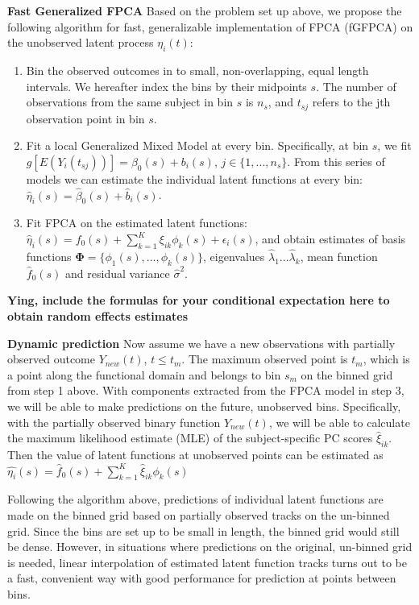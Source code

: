 \documentclass[
  11pt,
]{article}
\begin{document}
\textbf{Fast Generalized FPCA} Based on the problem set up above, we
propose the following algorithm for fast, generalizable implementation
of FPCA (fGFPCA) on the unobserved latent process \(\eta_i(t)\):

\begin{enumerate}
\def\labelenumi{\arabic{enumi}.}
\item
  Bin the observed outcomes in to small, non-overlapping, equal length
  intervals. We hereafter index the bins by their midpoints \(s\). The
  number of observations from the same subject in bin \(s\) is \(n_s\),
  and \(t_{sj}\) refers to the jth observation point in bin \(s\).
\item
  Fit a local Generalized Mixed Model at every bin. Specifically, at bin
  \(s\), we fit \(g[E(Y_i(t_{sj}))] = \beta_0(s)+b_i(s)\),
  \(j\in\{1, ..., n_s\}\). From this series of models we can estimate
  the individual latent functions at every bin:
  \(\hat{\eta}_i(s) = \hat{\beta}_0(s)+\hat{b}_i(s)\).
\item
  Fit FPCA on the estimated latent functions:
  \(\hat{\eta}_i(s) = f_0(s)+\sum_{k=1}^K\xi_{ik}\phi_{k}(s)+\epsilon_i(s)\),
  and obtain estimates of basis functions
  \(\boldsymbol{\Phi} = \{\phi_1(s), ...,\phi_k(s)\}\), eigenvalues
  \(\hat{\lambda}_1...\hat{\lambda}_k\), mean function \(\hat{f}_0(s)\)
  and residual variance \(\hat{\sigma}^2\).
\end{enumerate}

\textbf{Ying, include the formulas for your conditional expectation here
to obtain random effects estimates }

\textbf{Dynamic prediction} Now assume we have a new observations with
partially observed outcome \(Y_{new}(t)\), \(t\leq t_m\). The maximum
observed point is \(t_m\), which is a point along the functional domain
and belongs to bin \(s_m\) on the binned grid from step 1 above. With
components extracted from the FPCA model in step 3, we will be able to
make predictions on the future, unobserved bins. Specifically, with the
partially observed binary function \(Y_{new}(t)\), we will be able to
calculate the maximum likelihood estimate (MLE) of the subject-specific
PC scores \(\hat{\xi}_{ik}\). Then the value of latent functions at
unobserved points can be estimated as
\(\hat{\eta_i}(s)=\hat{f}_0(s)+\sum_{k=1}^K\hat{\xi}_{ik}{\phi}_k(s)\)

Following the algorithm above, predictions of individual latent
functions are made on the binned grid based on partially observed tracks
on the un-binned grid. Since the bins are set up to be small in length,
the binned grid would still be dense. However, in situations where
predictions on the original, un-binned grid is needed, linear
interpolation of estimated latent function tracks turns out to be a
fast, convenient way with good performance for prediction at points
between bins.
\end{document}
